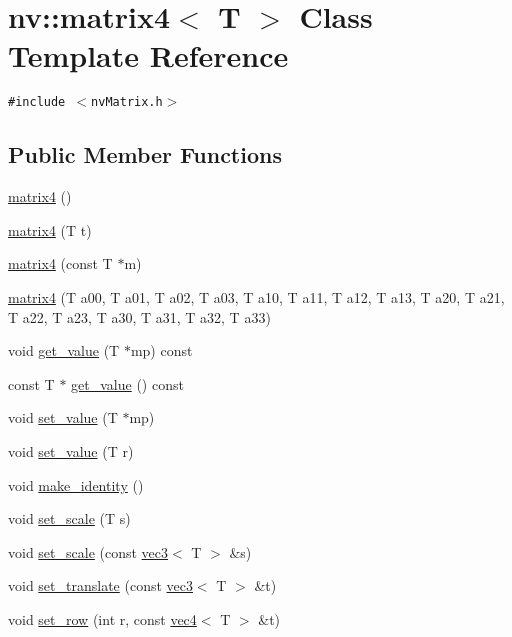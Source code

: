 \hypertarget{classnv_1_1matrix4}{
\section{nv::matrix4$<$ T $>$ Class Template Reference}
\label{classnv_1_1matrix4}
}
{\tt \#include $<$nvMatrix.h$>$}

\subsection*{Public Member Functions}
\begin{CompactItemize}
\item 
\hyperlink{classnv_1_1matrix4_36fc89111f3d5ad9e46945d4d0bd5921}{matrix4} ()
\item 
\hyperlink{classnv_1_1matrix4_008c4829e82374912faac747690c6466}{matrix4} (T t)
\item 
\hyperlink{classnv_1_1matrix4_0c19e0e5585f99d0c6423b157a927832}{matrix4} (const T $\ast$m)
\item 
\hyperlink{classnv_1_1matrix4_409943020eb2f60eed7c64ecfb803e37}{matrix4} (T a00, T a01, T a02, T a03, T a10, T a11, T a12, T a13, T a20, T a21, T a22, T a23, T a30, T a31, T a32, T a33)
\item 
void \hyperlink{classnv_1_1matrix4_7071f369675281ba258515b1169a246e}{get\_\-value} (T $\ast$mp) const 
\item 
const T $\ast$ \hyperlink{classnv_1_1matrix4_513224050dd280c216165b244e2a0a45}{get\_\-value} () const 
\item 
void \hyperlink{classnv_1_1matrix4_d19b1f9ae21c90f8a96ef158d8ff62ed}{set\_\-value} (T $\ast$mp)
\item 
void \hyperlink{classnv_1_1matrix4_36a90d798d71bdd3106ba5cdbbc40869}{set\_\-value} (T r)
\item 
void \hyperlink{classnv_1_1matrix4_76a93589ae31c19e90d9199a8510504c}{make\_\-identity} ()
\item 
void \hyperlink{classnv_1_1matrix4_6eec45000c6cdf881a50ecd09a6d803b}{set\_\-scale} (T s)
\item 
void \hyperlink{classnv_1_1matrix4_7663538941eda617052f477ec9eb2f15}{set\_\-scale} (const \hyperlink{classnv_1_1vec3}{vec3}$<$ T $>$ \&s)
\item 
void \hyperlink{classnv_1_1matrix4_03752260bd2264a4bcdfaa9b019f8777}{set\_\-translate} (const \hyperlink{classnv_1_1vec3}{vec3}$<$ T $>$ \&t)
\item 
void \hyperlink{classnv_1_1matrix4_d79dcdcafcf5fab54a990621f87c2f20}{set\_\-row} (int r, const \hyperlink{classnv_1_1vec4}{vec4}$<$ T $>$ \&t)

\end{CompactItemize}
